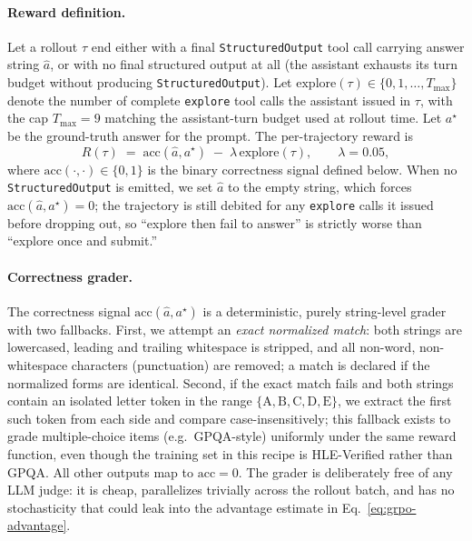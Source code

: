 \paragraph{Reward definition.}
Let a rollout $\tau$ end either with a final \texttt{StructuredOutput} tool call carrying answer string $\hat{a}$, or with no final structured output at all (the assistant exhausts its turn budget without producing \texttt{StructuredOutput}). Let $\mathrm{explore}(\tau) \in \{0,1,\dots,T_{\max}\}$ denote the number of complete \texttt{explore} tool calls the assistant issued in $\tau$, with the cap $T_{\max}=9$ matching the assistant-turn budget used at rollout time.
Let $a^{\star}$ be the ground-truth answer for the prompt. The per-trajectory reward is
\begin{equation}
R(\tau) \;=\; \mathrm{acc}(\hat{a}, a^{\star}) \;-\; \lambda\,\mathrm{explore}(\tau),
\qquad \lambda = 0.05,
\label{eq:reward}
\end{equation}
where $\mathrm{acc}(\cdot,\cdot) \in \{0,1\}$ is the binary correctness signal defined below. When no \texttt{StructuredOutput} is emitted, we set $\hat{a}$ to the empty string, which forces $\mathrm{acc}(\hat{a},a^{\star})=0$; the trajectory is still debited for any \texttt{explore} calls it issued before dropping out, so ``explore then fail to answer'' is strictly worse than ``explore once and submit.''

\paragraph{Correctness grader.}
The correctness signal $\mathrm{acc}(\hat{a}, a^{\star})$ is a deterministic, purely string-level grader with two fallbacks. First, we attempt an \emph{exact normalized match}: both strings are lowercased, leading and trailing whitespace is stripped, and all non-word, non-whitespace characters (punctuation) are removed; a match is declared if the normalized forms are identical. Second, if the exact match fails and both strings contain an isolated letter token in the range $\{\mathrm{A},\mathrm{B},\mathrm{C},\mathrm{D},\mathrm{E}\}$, we extract the first such token from each side and compare case-insensitively; this fallback exists to grade multiple-choice items (e.g.\ GPQA-style) uniformly under the same reward function, even though the training set in this recipe is HLE-Verified rather than GPQA. All other outputs map to $\mathrm{acc}=0$. The grader is deliberately free of any LLM judge: it is cheap, parallelizes trivially across the rollout batch, and has no stochasticity that could leak into the advantage estimate in Eq.~\eqref{eq:grpo-advantage}.

